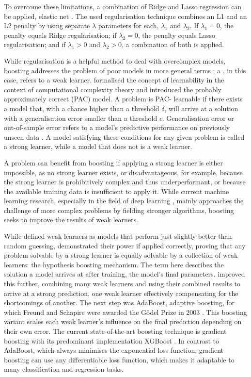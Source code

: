 To overcome these limitations, a combination of Ridge and Lasso regression can 
be applied, elastic net \citep{Zou2005}. The used regularisation technique 
combines an L1 and an L2 penalty by using separate $\lambda$ parameters for 
each, $\lambda_{1}$ and $\lambda_{2}$. If $\lambda_{1}=0$, the penalty equals 
Ridge regularisation; if $\lambda_{2}=0$, the penalty equals Lasso 
regularisation; and if $\lambda_{1}>0$ and $\lambda_{2}>0$, a combination of 
both is applied.
\bigbreak

\noindent While \label{mar:boosting} regularisation is a 
helpful method to deal with overcomplex models, boosting addresses the problem 
of poor models in more general terms \citep{Freund1999}; a , 
in this case, refers to a weak learner. \citet{ Valiant} formalised the 
concept of learnability in the context of computational complexity theory and 
introduced the probably approximately correct (PAC) model. A problem is PAC-
learnable if there exists a model that, with a chance higher than a threshold
$\delta$, will arrive at a solution with a generalisation error smaller than a 
threshold $\epsilon$. Generalisation error or out-of-sample error refers to a 
model's predictive performance on previously unseen data \citep{Bousquet2004}. 
A model satisfying these conditions for any given problem is called a strong 
learner, while a model that does not is a weak learner.

A problem can benefit from boosting if applying a strong learner is either 
impossible, as no strong learner exists, or disadvantageous, for example, 
because the strong learner is prohibitively complex and thus underperformant, 
or because the available training data is insufficient to apply it. While 
current machine learning research, especially in the field of deep learning 
\citep{LeCun2015}, mainly approaches the challenge of more complex problems by 
fielding stronger algorithms, boosting seeks to improve the results of weak 
learners.

While \citet{Kearns} defined weak learners as models that perform just 
slightly better than random guessing, \citet{Schapire1990} demonstrated their 
power if applied correctly, proving that any problem solvable by a strong 
learner is equally solvable by a collection of weak learners: the hypothesis 
boosting mechanism. The term  here describes the solution a 
model arrives at after training, the model's final parameters. \citet{
Freund1995} improved this further, combining many weak learners and using 
their combined results to arrive at a strong prediction, one weak learner 
effectively compensating for the shortcomings of another. The next step was 
AdaBoost, adaptive boosting, for which Freund and Schapire were awarded the 
Gödel Prize in 2003 \citep{Freund1997}. This boosting variant scales each weak 
learner's influence on the final prediction depending on their own error. The 
current state-of-the-art boosting technique is gradient boosting with its 
predominant implementation XGBoost \citep{Chen2016}. In contrast to AdaBoost, 
which always minimises the exponential loss function, gradient boosting can 
use any differentiable loss function, which makes it adaptable to many 
classification and regression tasks.

